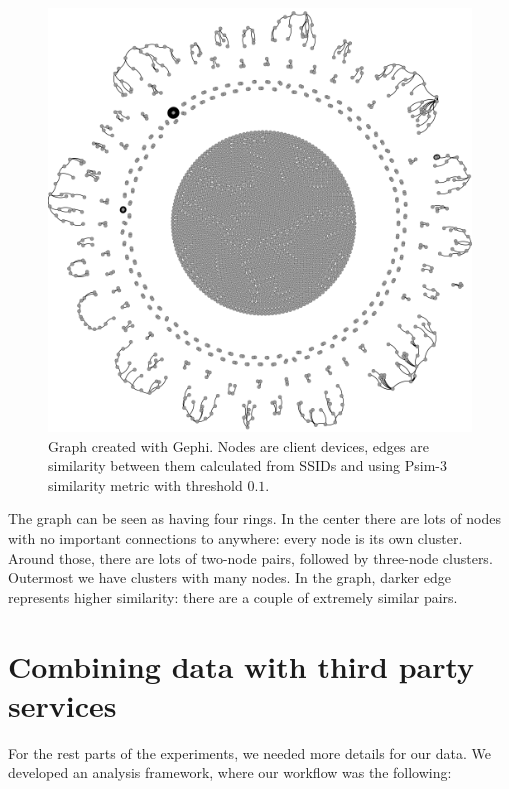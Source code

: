 \documentclass[12pt,a4paper,oneside,pdftex]{report}
\begin{document}
\begin{figure}
    \center
    \includegraphics[width=\textwidth]{images/gephi-01.png}
    \caption{Graph created with Gephi. Nodes are client devices, edges are similarity between them calculated from SSIDs and using Psim-3 similarity metric with threshold $0.1$.}
    \label{gephi_01}
\end{figure}

The graph can be seen as having four rings. In the center there are lots of nodes with no important connections to anywhere: every node is its own cluster. Around those, there are lots of two-node pairs, followed by three-node clusters. Outermost we have clusters with many nodes. In the graph, darker edge represents higher similarity: there are a couple of extremely similar pairs.



\section{Combining data with third party services}
\label{sec:practical_thirdpartt}

For the rest parts of the experiments, we needed more details for our data. We developed an analysis framework, where our workflow was the following:
\end{document}
